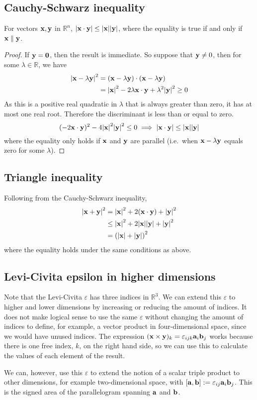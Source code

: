\subsection{Cauchy-Schwarz inequality}
\begin{proposition}
	For vectors \(\vb x, \vb y\) in \(\mathbb R^n\), \(\abs{\vb x \cdot \vb y} \leq \abs{\vb x} \abs{\vb y}\), where the equality is true if and only if \(\vb x \parallel \vb y\).
\end{proposition}
\begin{proof}
	If \(\vb y = \vb 0\), then the result is immediate.
	So suppose that \(\vb y \neq 0\), then for some \(\lambda \in \mathbb R\), we have
	\begin{align*}
		\abs{\vb x - \lambda \vb y}^2 & =
		(\vb x - \lambda \vb y) \cdot (\vb x - \lambda \vb y)                                                          \\
		                              & = \abs{\vb x}^2 - 2 \lambda \vb x \cdot \vb y + \lambda^2 \abs{\vb y}^2 \geq 0
	\end{align*}
	As this is a positive real quadratic in \(\lambda\) that is always greater than zero, it has at most one real root.
	Therefore the discriminant is less than or equal to zero.
	\[
		(-2 \vb x \cdot \vb y)^2 - 4 \abs{\vb x}^2\abs{\vb y}^2 \leq 0
		\implies \abs{\vb x \cdot \vb y} \leq \abs{\vb x}\abs{\vb y}
	\]
	where the equality only holds if \(\vb x\) and \(\vb y\) are parallel (i.e.\ when \(\vb x - \lambda \vb y\) equals zero for some \(\lambda\)).
\end{proof}

\subsection{Triangle inequality}
Following from the Cauchy-Schwarz inequality,
\begin{align*}
	\abs{\vb x + \vb y}^2
	 & = \abs{\vb x}^2 + 2(\vb x \cdot \vb y) + \abs{\vb y}^2        \\
	 & \leq \abs{\vb x}^2 + 2 \abs{\vb x}\abs{\vb y} + \abs{\vb y}^2 \\
	 & = \left(\abs{\vb x} + \abs{\vb y}\right)^2
\end{align*}
where the equality holds under the same conditions as above.

\subsection{Levi-Civita epsilon in higher dimensions}
Note that the Levi-Civita \(\varepsilon\) has three indices in \(\mathbb R^3\).
We can extend this \(\varepsilon\) to higher and lower dimensions by increasing or reducing the amount of indices.
It does not make logical sense to use the same \(\varepsilon\) without changing the amount of indices to define, for example, a vector product in four-dimensional space, since we would have unused indices.
The expression \((\vb x \times \vb y)_k = \varepsilon_{ijk} \vb a_i \vb b_j\) works because there is one free index, \(k\), on the right hand side, so we can use this to calculate the values of each element of the result.

We can, however, use this \(\varepsilon\) to extend the notion of a scalar triple product to other dimensions, for example two-dimensional space, with \([\vb a, \vb b] := \varepsilon_{ij} \vb a_i \vb b_j\).
This is the signed area of the parallelogram spanning \(\vb a\) and \(\vb b\).
